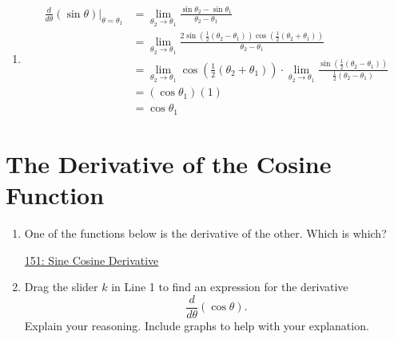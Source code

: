 \documentclass{ximera}
\begin{document}
\begin{example}
\begin{explanation}
\begin{enumerate}
\item 
\begin{align*}
  \frac{d}{d\theta}\left(  \sin\theta \right)\Big|_{\theta = \theta_1}& = \lim_{\theta_2\to\theta_1} \frac{\sin\theta_2 - \sin\theta_1}{\theta_2 - \theta_1}  \\
                        &= \lim_{\theta_2\to\theta_1}  \frac{2\sin\left( \frac{1}{2}\left( \theta_2 - \theta_1 \right)\right) \cos \left( \frac{1}{2}\left( \theta_2 +\theta_1 \right)\right)}{\theta_2 - \theta_1} \\
                         &= \lim_{\theta_2\to\theta_1} \cos \left( \frac{1}{2}\left( \theta_2 +\theta_1 \right)\right) \cdot  \lim_{\theta_2\to\theta_1} \frac{\sin\left( \frac{1}{2}\left( \theta_2 - \theta_1 \right)\right) }{\frac{1}{2}\left( \theta_2 - \theta_1 \right)} \\
           &= \left(  \cos\theta_1  \right)  (1) \\
           &= \cos \theta_1
\end{align*}
\end{enumerate}
\end{explanation}

\end{example}


\section{The Derivative of the Cosine Function}

\begin{example} \label{EppfemMvV}

\begin{enumerate}

\item One of the functions below is the derivative of the other. Which is which?
\begin{freeResponse}
\end{freeResponse}

\begin{onlineOnly}
    \begin{center}
\end{center}
\end{onlineOnly}

\href{https://www.desmos.com/calculator/atxecntid1}{151: Sine Cosine Derivative}

\item Drag the slider $k$ in Line 1 to find an expression for the derivative
\[
  \frac{d}{d\theta}\left(  \cos\theta \right).
\]
Explain your reasoning. Include graphs to help with your explanation.
\begin{freeResponse}
\end{freeResponse}

\end{enumerate}

\end{example}
\end{document}
